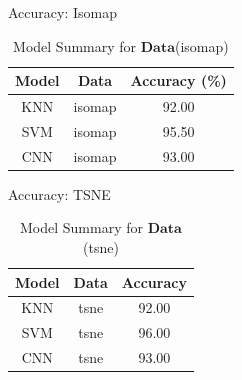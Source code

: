 \documentclass{beamer}
\theoremstyle{plain}
\theoremstyle{definition}
\theoremstyle{plain}
\theoremstyle{plain}
\begin{document}
\begin{frame}{Accuracy: Isomap}

\begin{table}[ht!]
\caption{Model Summary for $\mathbf{Data}$(isomap)}
\centering
\begin{tabular}{c c c }
\hline\hline
Model & Data & Accuracy (\%)\\ [0.5ex]
\hline
KNN & isomap & 92.00 \\
SVM & isomap & 95.50 \\
CNN & isomap & 93.00\\ [1ex]
\hline
\end{tabular}
\label{R:ISO}
\end{table}

\end{frame}
\begin{frame}{Accuracy: TSNE}

\begin{table}[ht]
\caption{Model Summary for $\mathbf{Data}$(tsne)}
\centering
\begin{tabular}{c c c }
\hline\hline
Model & Data & Accuracy\\ [0.5ex]
\hline
KNN & tsne & 92.00 \\
SVM & tsne & 96.00 \\
CNN & tsne & 93.00\\ [1ex]
\hline
\end{tabular}
\label{R:TSNE}
\end{table}
\end{frame}
\end{document}
